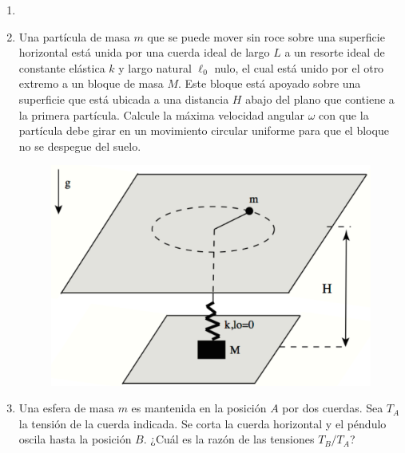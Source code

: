 \documentclass[letterpaper,11pt]{article}
\begin{document}
\vspace{-1cm}
\begin{enumerate}\setlength{\itemsep}{0.4cm}


\item[]

\item
\begin{multicols}{2} 
    Una partícula de masa $m$ que se puede mover sin roce sobre una superficie horizontal está unida por una cuerda ideal de largo $L$ a un resorte ideal de constante elástica $k$ y largo natural $\ell_0$ nulo, el cual está unido por el otro extremo a un bloque de masa $M$. Este bloque está apoyado sobre una superficie que está ubicada a una distancia $H$ abajo del plano que contiene a la primera partícula. Calcule la máxima velocidad angular $\omega$ con que la partícula debe girar en un movimiento circular uniforme para que el bloque no se despegue del suelo.
    
    \columnbreak
    \begin{figure}[H]
        \centering
        \includegraphics[width=0.8\linewidth]{2022-2/Imagenes/Taller5/resorte.png}
    \end{figure}
\end{multicols}

\item Una esfera de masa $m$ es mantenida en la posición $A$ por dos cuerdas. Sea $T_A$ la tensión de la cuerda indicada. Se corta la cuerda horizontal y el péndulo oscila hasta la posición $B$. ¿Cuál es la razón de las tensiones $T_B/T_A$?

\begin{figure}[H]
    \centering
    
\end{figure}


%   

\end{enumerate}
\end{document}
